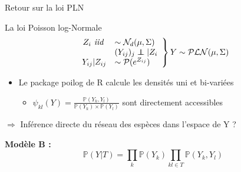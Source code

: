 \documentclass[11pt]{bredelebeamer}
\newcommand\independent{\protect\mathpalette{\protect\independenT}{\perp}}
\def\independenT#1#2{\mathrel{\rlap{$#1#2$}\mkern2mu{#1#2}}}
\begin{document}
\begin{frame}{Retour sur la loi PLN}
    
\begin{exampleblock}{La loi Poisson log-Normale}
\[
            \left.
                \begin{array}{rl}
                Z_i \textit{ iid } &\sim \mathcal{N}_{d}(\mu,\Sigma)\\
                    &(Y_{ij})_j \independent |Z_i\\
                    Y_{ij}|Z_{ij} &\sim \mathcal{P}(e^{Z_{ij}}) 
                   
                \end{array}
            \right \} Y \sim \mathcal{PLN}(\mu, \Sigma)  
            \]
            
       
\end{exampleblock}
\vspace{0.5cm}
\begin{itemize}
    \item Le package {\selectfont
poilog} de R calcule les densités uni et bi-variées \vspace{0.3cm}
    \begin{itemize}
        \item \large{$\psi_{kl}(Y) = \frac{\mathds{P}(Y_k,Y_l)}{\mathds{P}(Y_k)\times \mathds{P}(Y_l)} $} \normalsize sont directement accessibles
    \end{itemize}

\end{itemize}
\begin{center}
    $\Rightarrow$ Inférence directe du réseau des espèces dans l'espace de Y ?\\
\end{center}

\textbf{Modèle B :}
\[\mathds{P}(Y|T) = \prod_k \mathds{P}(Y_k) \prod_{kl \in T} \mathds{P}(Y_k,Y_l)\]
\end{frame}
\end{document}
